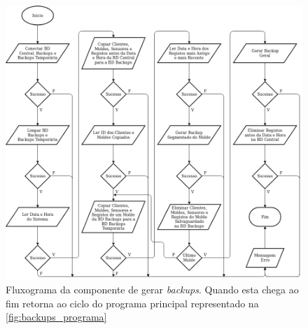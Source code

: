 \documentclass[11pt,twoside,a4paper]{report}
\begin{document}
\begin{figure}
	\begin{center}
		\includegraphics[width=1\textwidth]{fluxograma_backups_gerar01} %
		\caption[Fluxograma da componente de gerar \textit{backups}]{Fluxograma da componente de gerar \textit{backups}. Quando esta chega ao fim retorna ao ciclo do programa principal representado na \autoref{fig:backups_programa}}
		\label{fig:backups_gerar}
	\end{center}
\end{figure}
\end{document}
